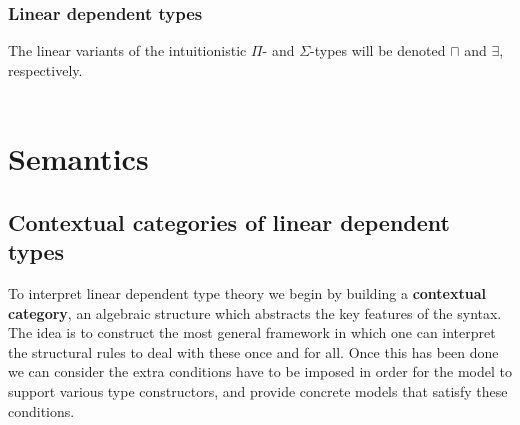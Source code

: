 \subsubsection{Linear dependent types}
The linear variants of the intuitionistic $\Pi$- and $\Sigma$-types will be denoted $\sqcap$ and $\exists$, respectively.\\
\\

\section{Semantics}
\subsection{Contextual categories of linear dependent types}
To interpret linear dependent type theory we begin by building a \textbf{contextual category}, an algebraic structure which abstracts the key features of the syntax. The idea is to construct the most general framework in which one can interpret the structural rules to deal with these once and for all. Once this has been done we can consider the extra conditions have to be imposed in order for the model to support various type constructors, and provide concrete models that satisfy these conditions.\\

